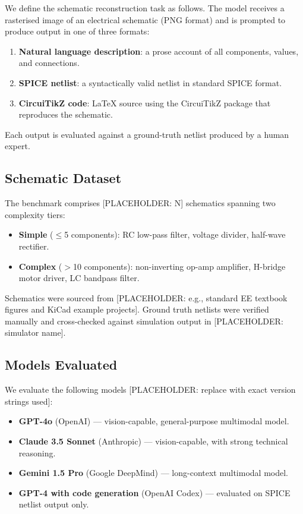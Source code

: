 \documentclass[conference]{IEEEtran}
\begin{document}
We define the schematic reconstruction task as follows. The model receives a rasterised image of an electrical schematic (PNG format) and is prompted to produce output in one of three formats:

\begin{enumerate}
    \item \textbf{Natural language description}: a prose account of all components, values, and connections.
    \item \textbf{SPICE netlist}: a syntactically valid netlist in standard SPICE format.
    \item \textbf{CircuiTikZ code}: LaTeX source using the CircuiTikZ package that reproduces the schematic.
\end{enumerate}

Each output is evaluated against a ground-truth netlist produced by a human expert.

\subsection{Schematic Dataset}

The benchmark comprises [PLACEHOLDER: N] schematics spanning two complexity tiers:

\begin{itemize}
    \item \textbf{Simple} ($\leq$5 components): RC low-pass filter, voltage divider, half-wave rectifier.
    \item \textbf{Complex} ($>$10 components): non-inverting op-amp amplifier, H-bridge motor driver, LC bandpass filter.
\end{itemize}

Schematics were sourced from [PLACEHOLDER: e.g., standard EE textbook figures and KiCad example projects]. Ground truth netlists were verified manually and cross-checked against simulation output in [PLACEHOLDER: simulator name].

\subsection{Models Evaluated}

We evaluate the following models [PLACEHOLDER: replace with exact version strings used]:

\begin{itemize}
    \item \textbf{GPT-4o} (OpenAI) — vision-capable, general-purpose multimodal model.
    \item \textbf{Claude 3.5 Sonnet} (Anthropic) — vision-capable, with strong technical reasoning.
    \item \textbf{Gemini 1.5 Pro} (Google DeepMind) — long-context multimodal model.
    \item \textbf{GPT-4 with code generation} (OpenAI Codex) — evaluated on SPICE netlist output only.
\end{itemize}
\end{document}
